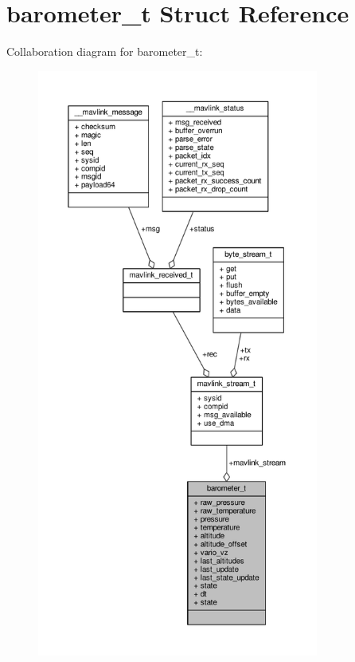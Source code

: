 \hypertarget{structbarometer__t}{\section{barometer\+\_\+t Struct Reference}
\label{structbarometer__t}
}


Collaboration diagram for barometer\+\_\+t\+:
\nopagebreak
\begin{figure}[H]
\begin{center}
\leavevmode
\includegraphics[height=550pt]{structbarometer__t__coll__graph}
\end{center}
\end{figure}
